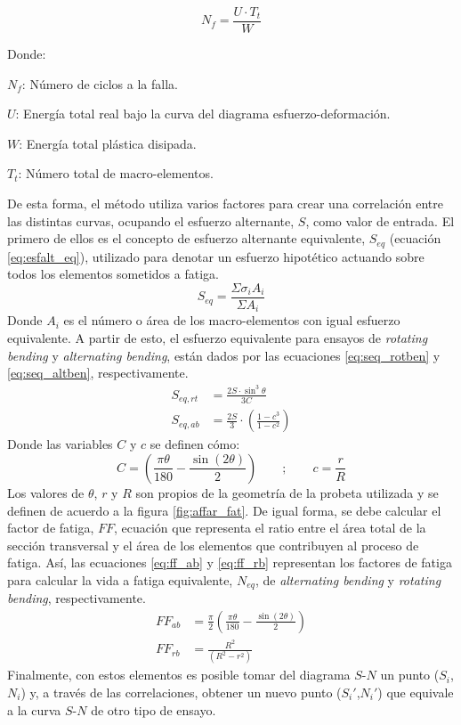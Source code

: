 \begin{equation}\label{eq:nfail_esin}
	N_f = \frac{U \cdot T_t}{W} 
\end{equation}

Donde:
\begin{itemize*}
	\item $N_f$: Número de ciclos a la falla.
	\item $U$: Energía total real bajo la curva del diagrama esfuerzo-deformación.
	\item $W$: Energía total plástica disipada.
	\item $T_t$: Número total de macro-elementos.
\end{itemize*}

De esta forma, el método utiliza varios factores para crear una correlación entre las distintas curvas, ocupando el esfuerzo alternante, $S$, como valor de entrada. El primero de ellos es el concepto de esfuerzo alternante equivalente, $S_{eq}$ (ecuación \ref{eq:esfalt_eq}), utilizado para denotar un esfuerzo hipotético actuando sobre todos los elementos sometidos a fatiga. 
\begin{equation}\label{eq:esfalt_eq}
	S_{eq} = \frac{\Sigma \sigma_i A_i}{\Sigma A_i}
\end{equation}
Donde $A_i$ es el número o área de los macro-elementos con igual esfuerzo equivalente. A partir de esto, el esfuerzo equivalente para ensayos de \textit{rotating bending} y \textit{alternating bending}, están dados por las ecuaciones \ref{eq:seq_rotben} y \ref{eq:seq_altben}, respectivamente. 
\begin{align}
	S_{eq,rt} &= \frac{2S\cdot \sin^3 \theta}{3C} \label{eq:seq_rotben}\\
	S_{eq,ab} &= \frac{2S}{3} \cdot \left(\frac{1-c^3}{1-c^2}\right) \label{eq:seq_altben}
\end{align}
Donde las variables $C$ y $c$ se definen cómo:
\begin{equation}
	C= \left(\frac{\pi\theta}{180} - \frac{\sin(2\theta)}{2}\right)\qquad ;\qquad c=\frac{r}{R}
\end{equation}
Los valores de $\theta$, $r$ y $R$ son propios de la geometría de la probeta utilizada y se definen de acuerdo a la figura \ref{fig:affar_fat}. De igual forma, se debe calcular el factor de fatiga, $FF$, ecuación que representa el ratio entre el área total de la sección transversal y el área de los elementos que contribuyen al proceso de fatiga. Así, las ecuaciones \ref{eq:ff_ab} y \ref{eq:ff_rb} representan los factores de fatiga para calcular la vida a fatiga equivalente, $N_{eq}$, de \textit{alternating bending} y \textit{rotating bending}, respectivamente.
\begin{align}
	FF_{ab} &= \frac{\pi}{2} \left(\frac{\pi\theta}{180} - \frac{\sin(2\theta)}{2}\right) \label{eq:ff_ab}\\		
	FF_{rb} &= \frac{R^2}{(R^2 - r^2)} \label{eq:ff_rb}
\end{align}
Finalmente, con estos elementos es posible tomar del diagrama $S$-$N$ un punto ($S_i$,$N_i$) y, a través de las correlaciones, obtener un nuevo punto ($S_i'$,$N_i'$) que equivale a la curva $S$-$N$ de otro tipo de ensayo.

